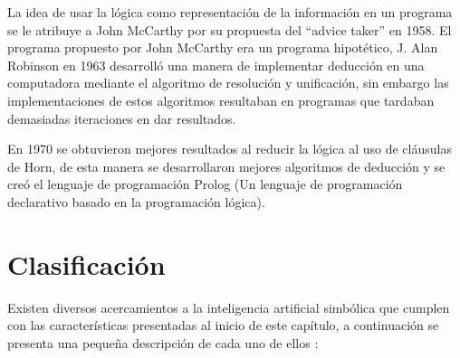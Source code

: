 \documentclass[11pt,fleqn]{book} %
\begin{document}
La idea de usar la lógica como representación de la información en un programa se le atribuye a John McCarthy por su propuesta del “advice taker” en 1958. El programa propuesto por John McCarthy era un programa hipotético, J. Alan Robinson en 1963 desarrolló una manera de implementar deducción en una computadora mediante el algoritmo de resolución y unificación, sin embargo las implementaciones de estos algoritmos resultaban en programas que tardaban demasiadas iteraciones en dar resultados.

En 1970 se obtuvieron mejores resultados al reducir la lógica al uso de cláusulas de Horn, de esta manera se desarrollaron mejores algoritmos de deducción y se creó el lenguaje de programación Prolog (Un lenguaje de programación declarativo basado en la programación lógica).

\section{Clasificación} 
Existen diversos acercamientos a la inteligencia artificial simbólica que cumplen con las características presentadas al inicio de este capítulo, a continuación se presenta una pequeña descripción de cada uno de ellos \cite{flasinski2016symbolic}:
\end{document}

